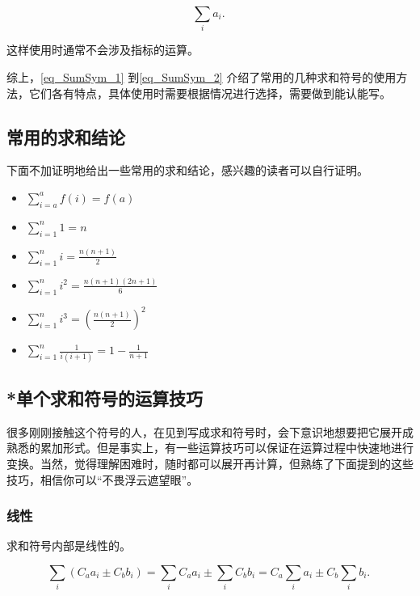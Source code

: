 \begin{equation}
\label{eq_SumSym_2}
\sum_i a_i.~
\end{equation}

这样使用时通常不会涉及指标的运算。



综上，\autoref{eq_SumSym_1} 到\autoref{eq_SumSym_2} 介绍了常用的几种求和符号的使用方法，它们各有特点，具体使用时需要根据情况进行选择，需要做到能认能写。

\subsection{常用的求和结论}

下面不加证明地给出一些常用的求和结论，感兴趣的读者可以自行证明。

\begin{itemize}
\item $\displaystyle\sum\limits_{i=a}^a f(i) = f(a)$
\item $\displaystyle\sum\limits_{i=1}^n 1 = n$
\item $\displaystyle\sum\limits_{i=1}^n i = \frac{n(n+1)}{2}$
\item $\displaystyle\sum\limits_{i=1}^n i^2 = \frac{n(n+1)(2n+1)}{6}$
\item $\displaystyle\sum\limits_{i=1}^n i^3 = \left( \frac{n(n+1)}{2} \right)^2$
\item $\displaystyle\sum\limits_{i=1}^n \frac{1}{i(i+1)} = 1 - \frac{1}{n+1}$
\end{itemize}



\subsection{*单个求和符号的运算技巧}

很多刚刚接触这个符号的人，在见到写成求和符号时，会下意识地想要把它展开成熟悉的累加形式。但是事实上，有一些运算技巧可以保证在运算过程中快速地进行变换。当然，觉得理解困难时，随时都可以展开再计算，但熟练了下面提到的这些技巧，相信你可以“不畏浮云遮望眼”。

\subsubsection{线性}

求和符号内部是线性的。

\begin{equation}
\sum_{i} (C_aa_i \pm C_bb_i) =\sum_{i} C_aa_i \pm \sum_{i} C_bb_i=C_a\sum_{i} a_i \pm C_b\sum_{i} b_i.~
\end{equation}

